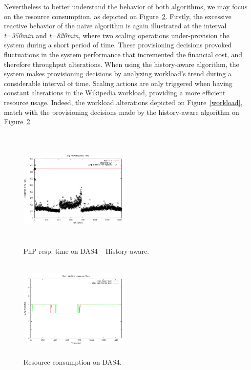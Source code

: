 Nevertheless to better understand the behavior of both algorithms, we may focus on the resource consumption, as depicted on Figure~\ref{resComDas4}. Firstly, the excessive reactive behavior of the naive algorithm is again illustrated at the interval \emph{t=350min} and \emph{t=820min}, where two scaling operations under-provision the system during a short period of time. These provisioning decisions provoked fluctuations in the system performance that incremented the financial cost, and therefore throughput alterations. When using the history-aware algorithm, the system makes provisioning decisions by analyzing workload's trend during a considerable interval of time. Scaling actions are only triggered when having constant alterations in the Wikipedia workload, providing a more efficient resource usage. Indeed, the workload alterations depicted on Figure~\ref{workload}, match with the provisioning decisions made by the history-aware algorithm on Figure~\ref{resComDas4}.

\begin{figure}
\begin{center}
\includegraphics[width=0.49\textwidth, height=6cm]{./images/homogeneous/avgTimeout_PhP_history}
\end{center}
\caption{PhP resp. time on DAS4 -- History-aware.}
\label{historyDas4}
\end{figure}

\begin{figure}
\begin{center}
\includegraphics[width=0.49\textwidth, height=5cm]{./images/homogeneous/numMachinesComp}
\end{center}
\caption{Resource consumption on DAS4.}
\label{resComDas4}
\end{figure}

